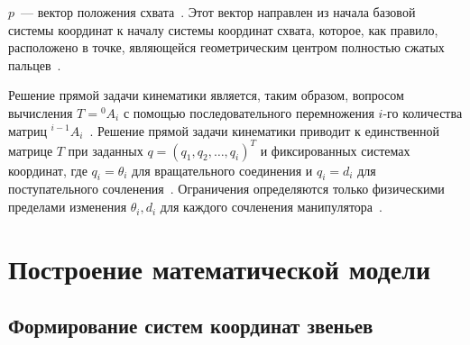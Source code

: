 \documentclass[oneside, final, 14pt]{extarticle}
\begin{document}
\par
\(p\)~--- вектор положения схвата~\cite{fu:rob_tech}. Этот вектор направлен из начала базовой системы координат к началу системы координат схвата, которое, как правило, расположено в точке, являющейся геометрическим центром полностью сжатых пальцев~\cite{fu:rob_tech}.
\par
Решение прямой задачи кинематики является, таким образом, вопросом вычисления \(T = {}^0A_i\) с помощью последовательного перемножения \(i\)-го количества матриц \({}^{i-1}A_i\)~\cite{fu:rob_tech}.
Решение прямой задачи кинематики приводит к единственной матрице \(T\) при заданных \(q = (q_1, q_2,\ldots, q_i)^T\) и фиксированных системах координат, где \(q_i = \theta_i\) для вращательного соединения и \(q_i = d_i\) для поступательного сочленения~\cite{fu:rob_tech}.
Ограничения определяются только физическими пределами изменения \(\theta_i, d_i\) для каждого сочленения манипулятора~\cite{fu:rob_tech}.

\newpage

\section{Построение математической модели}

\subsection{Формирование систем координат звеньев}
\end{document}
